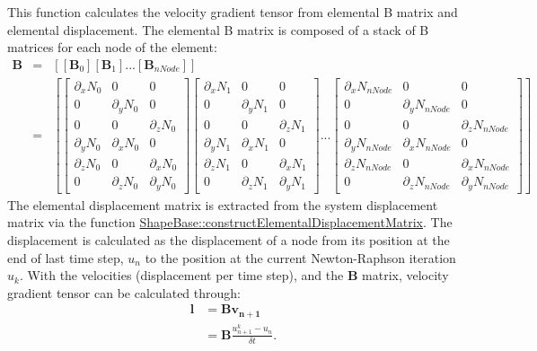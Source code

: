 This function calculates the velocity gradient tensor from elemental B matrix and elemental displacement. The elemental B matrix is composed of a stack of B matrices for each node of the element\+: \begin{eqnarray*} \textbf{B} &=& \left[ \left[ \textbf{B}_{0} \right] \left[ \textbf{B}_{1} \right] ... \left[ \textbf{B}_{nNode}\right] \right]\\ &=& \left[ \begin{bmatrix} \partial_x N_0 & 0 & 0 \\ 0 & \partial_y N_0 & 0 \\ 0 & 0 & \partial_z N_0 \\ \partial_y N_0 & \partial_x N_0 & 0\\ \partial_z N_0 & 0 & \partial_x N_0 \\ 0 & \partial_z N_0 & \partial_y N_0 \end{bmatrix} \begin{bmatrix} \partial_x N_1 & 0 & 0 \\ 0 & \partial_y N_1 & 0 \\ 0 & 0 & \partial_z N_1 \\ \partial_y N_1 & \partial_x N_1 & 0\\ \partial_z N_1 & 0 & \partial_x N_1 \\ 0 & \partial_z N_1 & \partial_y N_1 \end{bmatrix} ... \begin{bmatrix} \partial_x N_{nNode} & 0 & 0 \\ 0 & \partial_y N_{nNode} & 0 \\ 0 & 0 & \partial_z N_{nNode} \\ \partial_y N_{nNode} & \partial_x N_{nNode} & 0\\ \partial_z N_{nNode} & 0 & \partial_x N_{nNode} \\ 0 & \partial_z N_{nNode} & \partial_y N_{nNode} \end{bmatrix} \right] \end{eqnarray*} The elemental displacement matrix is extracted from the system displacement matrix via the function \hyperlink{classShapeBase_afcdbbe37a746ade52a1af70a9aa12b9f}{Shape\+Base\+::construct\+Elemental\+Displacement\+Matrix}. The displacement is calculated as the displacement of a node from its position at the end of last time step, $ u_{n}$ to the position at the current Newton-\/\+Raphson iteration $ u_{k}$. With the velocities (displacement per time step), and the $\textbf{B}$ matrix, velocity gradient tensor can be calculated through\+: \begin{eqnarray*} \boldsymbol{l} & = \boldsymbol{B} \boldsymbol{v_{n+1}}\nonumber \\ & = \boldsymbol{B} \frac{{u_{n+1}^{k} - u_{n}}} {\delta t}. \end{eqnarray*}

